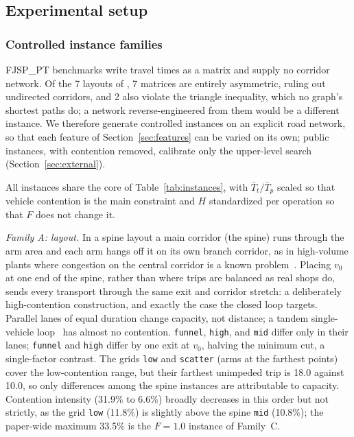 \documentclass[preprint,review,12pt,authoryear,doubleblind]{elsarticle}
\newcommand{\ContentionLo}{6.6\%}
\newcommand{\ContentionHi}{33.5\%}
\newcommand{\ContentionAHi}{31.9\%}
\newcommand{\ContentionALow}{11.8\%}
\newcommand{\ContentionAMid}{10.8\%}
\newcommand{\LegDumbbell}{10.0}          %
\newcommand{\LegGrid}{18.0}              %
\newcommand{\PubNLayout}{7}
\newcommand{\PubNLayoutAsym}{7}           %
\newcommand{\PubNLayoutBad}{2}            %
\begin{document}
\subsection{Experimental setup}
\label{sec:instances}

\subsubsection{Controlled instance families}
FJSP\_PT benchmarks write travel times as a matrix and supply no corridor network.
Of the \PubNLayout{} layouts of \citet{homayouni2021production}, \PubNLayoutAsym{} matrices are entirely asymmetric, ruling out undirected corridors, and \PubNLayoutBad{} also violate the triangle inequality, which no graph's shortest paths do; a network reverse-engineered from them would be a different instance.
We therefore generate controlled instances on an explicit road network, so that each feature of Section~\ref{sec:features} can be varied on its own; public instances, with contention removed, calibrate only the upper-level search (Section~\ref{sec:external}).

All instances share the core of Table~\ref{tab:instances}, with $\bar{T}_t/\bar{T}_p$ scaled so that vehicle contention is the main constraint and $H$ standardized per operation so that $F$ does not change it.

\emph{Family A: layout.}
In a spine layout a main corridor (the spine) runs through the arm area and each arm hangs off it on its own branch corridor, as in high-volume plants where congestion on the central corridor is a known problem~\citep{suh2022spine}.
Placing $v_0$ at one end of the spine, rather than where trips are balanced as real shops do, sends every transport through the same exit and corridor stretch: a deliberately high-contention construction, and exactly the case the closed loop targets.
Parallel lanes of equal duration change capacity, not distance; a tandem single-vehicle loop~\citep{rahimikelarijani2020tandem} has almost no contention.
\texttt{funnel}, \texttt{high}, and \texttt{mid} differ only in their lanes; \texttt{funnel} and \texttt{high} differ by one exit at $v_0$, halving the minimum cut, a single-factor contrast.
The grids \texttt{low} and \texttt{scatter} (arms at the farthest points) cover the low-contention range, but their farthest unimpeded trip is \LegGrid{} against \LegDumbbell{}, so only differences among the spine instances are attributable to capacity.
Contention intensity (\ContentionAHi{} to \ContentionLo{}) broadly decreases in this order but not strictly, as the grid \texttt{low} (\ContentionALow{}) is slightly above the spine \texttt{mid} (\ContentionAMid{}); the paper-wide maximum \ContentionHi{} is the $F=1.0$ instance of Family~C.
\end{document}

